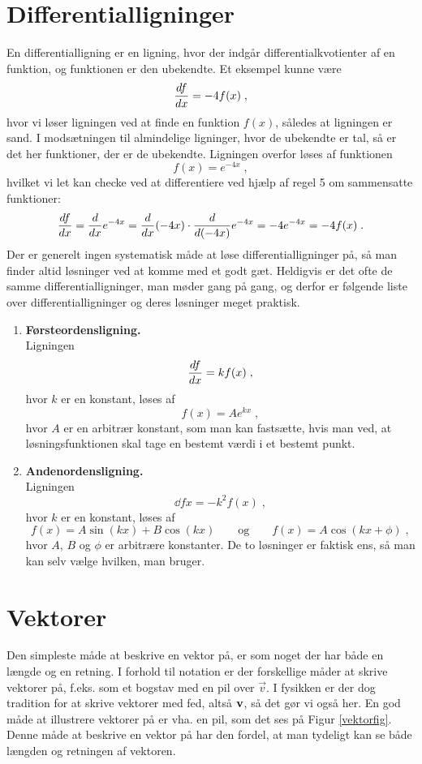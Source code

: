 \section{Differentialligninger}
En differentialligning er en ligning, hvor der indgår
differentialkvotienter af en funktion, og funktionen er den
ubekendte. Et eksempel kunne være
\[
\d{f}{x} = -4 f(x) \; ,
\]
hvor vi løser ligningen ved at finde en funktion $f(x)$, således at
ligningen er sand. I modsætningen til almindelige ligninger, hvor de
ubekendte er tal, så er det her funktioner, der er de
ubekendte. Ligningen overfor løses af funktionen
\[
f(x) = e^{-4x} \; ,
\]
hvilket vi let kan checke ved at differentiere ved hjælp af regel 5 om
sammensatte funktioner:
\[
\d{f}{x} = \dl{e^{-4x}}{x}
= \dl{(-4x)}{x} \cdot \dl{e^{-4x}}{(-4x)}
= -4 e^{-4x} = -4 f(x) \; .
\]
Der er generelt ingen systematisk måde at løse differentialligninger
på, så man finder altid løsninger ved at komme med et godt
gæt. Heldigvis er det ofte de samme differentialligninger, man møder
gang på gang, og derfor er følgende liste over differentialligninger
og deres løsninger meget praktisk.

\begin{enumerate}[resume]
\item\label{itm:d-lign1} \textbf{Førsteordensligning.}\\
  Ligningen
  \[
  \d{f}{x} = k f(x) \; ,
  \]
  hvor $k$ er en konstant, løses af
  \[
  f(x) = A e^{kx} \; ,
  \]
  hvor $A$ er en arbitrær konstant, som man kan fastsætte, hvis man
  ved, at løsningsfunktionen skal tage en bestemt værdi i et bestemt
  punkt.
\item\label{itm:d-lign2} \textbf{Andenordensligning.}\\
  Ligningen
  \[
  \dd{f}{x} = -k^2 f(x) \; ,
  \]
  hvor $k$ er en konstant, løses af
  \[
  f(x) = A \sin (kx) + B \cos (kx)
  \qquad \text{og} \qquad
  f(x) = A \cos (kx + \phi) \; ,
  \]
  hvor $A$, $B$ og $\phi$ er arbitrære konstanter. De to løsninger er
  faktisk ens, så man kan selv vælge hvilken, man bruger.
\end{enumerate}

\section{Vektorer}

Den simpleste måde at beskrive en vektor på, er som noget der har både en længde og en retning. I forhold til notation er der forskellige måder at skrive vektorer på, f.eks. som et bogstav med en pil over $\vec{v}$. I fysikken er der dog tradition for at skrive vektorer med fed, altså $\v{v}$, så det gør vi også her. En god måde at illustrere vektorer på er vha. en pil, som det ses på Figur \ref{vektorfig}. Denne måde at beskrive en vektor på har den fordel, at man tydeligt kan se både længden og retningen af vektoren.\\

